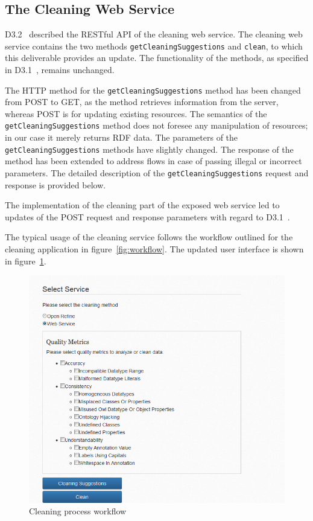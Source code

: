 \subsection{The Cleaning Web Service}
\label{sec:cleaningService}

D3.2~\cite{d3.2} described the RESTful API of the cleaning web service. 
The cleaning web service contains the two methods \texttt{getCleaningSuggestions} and \texttt{clean}, to which this deliverable provides an update.
The functionality of the methods, as specified in D3.1~\cite{d3.1}, remains unchanged.

The HTTP method for the \texttt{getCleaningSuggestions} method has been changed from POST to GET, as the method retrieves information from the server, whereas POST is for updating existing resources.  The semantics of the \texttt{getCleaningSuggestions} method does not foresee any manipulation of resources; in our case it merely returns RDF data.
The parameters of the \texttt{getCleaningSuggestions} methods have slightly changed.  The response of the method has been extended to address flows in case of passing illegal or incorrect parameters. The detailed description of the \texttt{getCleaningSuggestions} request and response is provided below.

The implementation of the cleaning part of the exposed web service led to updates of the POST request and response parameters with regard to D3.1~\cite{d3.1}.

The typical usage of the cleaning service follows the workflow outlined for the cleaning application in figure~\ref{fig:workflow}.
The updated user interface is shown in figure~\ref{fig:ui}.

\begin{figure}[ht!]
\centering
\includegraphics[width=\textwidth]{figures/WebService.png}
\caption{Cleaning process workflow}
\label{fig:ui}
\end{figure}





